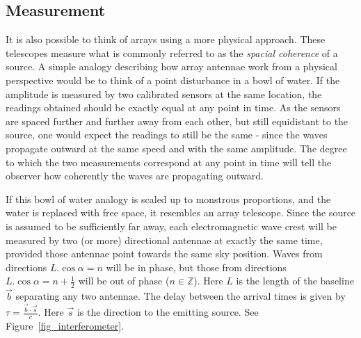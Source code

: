 \subsection{Measurement}
It is also possible to think of arrays using a more physical approach. These telescopes measure what is commonly referred 
to as the \textit{spacial coherence} of a source. A simple analogy describing how array antennae work from a physical 
perspective would be to think of a point disturbance in a bowl of water. If the amplitude is measured by two calibrated 
sensors at the same location, the readings obtained should be exactly equal at any point in time. As the sensors are 
spaced further and further away from each other, but still equidistant to the source, one would expect the readings to still
be the same - since the waves propagate outward at the same speed and with the same amplitude. The degree to which
the two measurements correspond at any point in time will tell the observer how coherently the waves are propagating outward.

If this bowl of water analogy is scaled up to monstrous proportions, and the water is replaced with free space, it 
resembles an array telescope. Since the source is assumed to be sufficiently far away, each electromagnetic wave crest 
will be measured by two (or more) directional antennae at exactly the same time, provided those antennae point
towards the same sky position. Waves from directions $L.\cos{\alpha}=n$ will be in phase, but those from
directions $L.\cos{\alpha} = n + \frac{1}{2}$ will be out of phase ($n\in\mathbb{Z}$). Here $L$ is the length of the 
baseline $\vec{b}$ separating any two antennae. The delay between the arrival times is given 
by $\tau=\frac{\vec{b}\cdot\vec{s}}{c}$. Here $\vec{s}$ is the direction to the emitting source. See 
Figure~\ref{fig_interferometer}.

